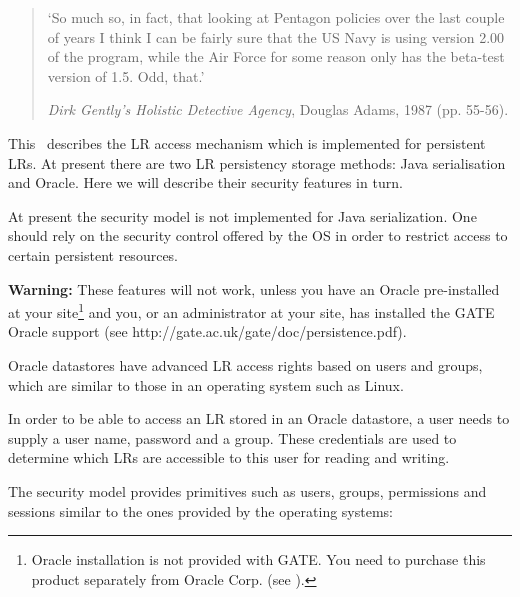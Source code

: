 \begin{quote}
`So much so, in fact, that looking at Pentagon policies over the
last couple of years I think I can be fairly sure that the US
Navy is using version 2.00 of the program, while the Air Force
for some reason only has the beta-test version of 1.5. Odd,
that.'

{\it Dirk Gently's Holistic Detective Agency}, Douglas Adams, 1987 (pp. 55-56).
\end{quote}

This \chapthing\ describes the LR access mechanism which is implemented
for persistent LRs. At present there are two LR persistency storage
methods: Java serialisation and Oracle. Here we will describe their
security features in turn.

At present the security model is not implemented for Java
serialization. One should rely on the security control offered by
the OS in order to restrict access to certain persistent
resources.


{\bf Warning:} These features will not work, unless you have an
Oracle pre-installed at your site\footnote{Oracle installation is
not provided with GATE. You need to purchase this product
separately from Oracle Corp. (see ).} and you, or an administrator at your
site, has installed the GATE Oracle support (see
http://gate.ac.uk/gate/doc/persistence.pdf).

Oracle datastores have advanced LR access rights based on users and
groups, which are similar to those in an operating system such as Linux.

In order to be able to access an LR stored in an Oracle datastore, a
user needs to supply a user name, password and a group. These
credentials are used to determine which LRs are accessible to this user
for reading and writing.


The security model provides primitives such as users, groups,
permissions and sessions similar to the ones provided by the
operating systems:

